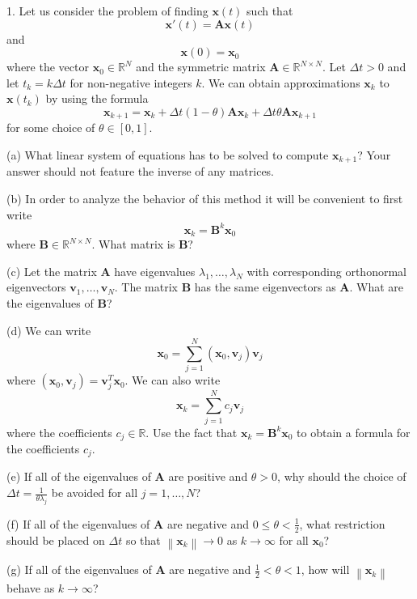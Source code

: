 \documentclass[11pt,twoside,reqno,a4paper]{amsart}
\begin{document}
1.
Let us consider the problem of finding $\boldsymbol{x}\left(t\right)$ such that
\[
\boldsymbol{x}'\left(t\right)=\boldsymbol{A}\boldsymbol{x}\left(t\right)
\]
and
\[
\boldsymbol{x}\left(0\right)=\boldsymbol{x}_0
\]
where the vector $\boldsymbol{x}_0\in\mathbb{R}^N$ and the symmetric matrix $\boldsymbol{A}\in\mathbb{R}^{N\times N}$. Let $\Delta t>0$ and let $t_k=k\Delta t$ for non-negative integers $k$. We can obtain approximations $\boldsymbol{x}_k$ to $\boldsymbol{x}\left(t_k\right)$ by using the formula
\[
\boldsymbol{x}_{k+1}=\boldsymbol{x}_k+\Delta t\left(1-\theta\right)\boldsymbol{A}\boldsymbol{x}_k+\Delta t\theta\boldsymbol{A}\boldsymbol{x}_{k+1}
\]
for some choice of $\theta\in[0,1]$.

(a) What linear system of equations has to be solved to compute $\boldsymbol{x}_{k+1}$? Your answer should not feature the inverse of any matrices.

(b) In order to analyze the behavior of this method it will be convenient to first write
\[
\boldsymbol{x}_k=\boldsymbol{B}^k\boldsymbol{x}_0
\]
where $\boldsymbol{B}\in\mathbb{R}^{N\times N}$. What matrix is $\boldsymbol{B}$?

(c) Let the matrix $\boldsymbol{A}$ have eigenvalues $\lambda_1,\ldots,\lambda_N$ with corresponding orthonormal eigenvectors $\boldsymbol{v}_1,\ldots,\boldsymbol{v}_N$. The matrix $\boldsymbol{B}$ has the same eigenvectors as $\boldsymbol{A}$. What are the eigenvalues of $\boldsymbol{B}$?

(d) We can write
\[
\boldsymbol{x}_0=\sum_{j=1}^N\left(\boldsymbol{x}_0,\boldsymbol{v}_j\right)\boldsymbol{v}_j
\]
where $\left(\boldsymbol{x}_0,\boldsymbol{v}_j\right)=\boldsymbol{v}_j^T\boldsymbol{x}_0$. We can also write
\[
\boldsymbol{x}_k=\sum_{j=1}^N c_j\boldsymbol{v}_j
\]
where the coefficients $c_j\in\mathbb{R}$. Use the fact that $\boldsymbol{x}_k=\boldsymbol{B}^k\boldsymbol{x}_0$ to obtain a formula for the coefficients $c_j$.

(e) If all of the eigenvalues of $\boldsymbol{A}$ are positive and $\theta>0$, why should the choice of $\Delta t=\frac{1}{\theta\lambda_j}$ be avoided for all $j=1,\ldots,N$?

(f) If all of the eigenvalues of $\boldsymbol{A}$ are negative and $0\le\theta<\frac{1}{2}$, what restriction should be placed on $\Delta t$ so that $\left\|\boldsymbol{x}_k\right\|\rightarrow0$ as $k\rightarrow\infty$ for all $\boldsymbol{x}_0$?

(g) If all of the eigenvalues of $\boldsymbol{A}$ are negative and $\frac{1}{2}<\theta<1$, how will $\left\|\boldsymbol{x}_k\right\|$ behave as $k\rightarrow\infty$?
\end{document}
